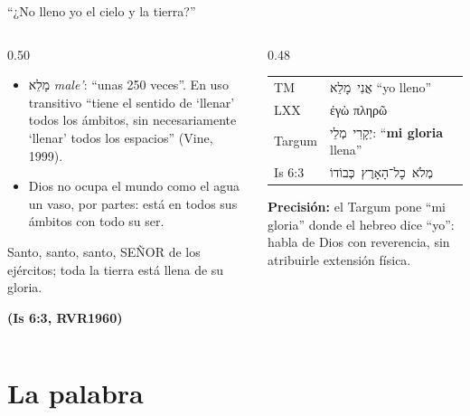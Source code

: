 \documentclass[hyperref={bookmarks=false},aspectratio=169]{beamer}
\newcommand{\heb}[1]{\mbox{\foreignlanguage{hebrew}{#1}}}
\newcommand{\grc}[1]{\foreignlanguage{ancientgreek}{#1}}
\newcommand{\SENOR}{S{\fontsize{0.78em}{1em}\selectfont EÑOR}}
\newcommand{\fuente}[1]{\par\hfill{\upshape\bfseries\footnotesize\textcolor{azul}{#1}}}
\newcommand{\destacar}[1]{\textbf{\textcolor{azul}{#1}}}
\newcommand{\precision}[1]{{\footnotesize\color{gris}\textbf{Precisión:} #1}}
\begin{document}
\begin{frame}{``¿No lleno yo el cielo y la tierra?''}
\begin{columns}[t,onlytextwidth]
\begin{column}{0.50\textwidth}\small
\begin{itemize}
\item \heb{מָלֵא} \emph{male'}: ``unas 250 veces''. En uso transitivo ``tiene el sentido de `llenar' todos los ámbitos, sin necesariamente `llenar' todos los espacios'' (Vine, 1999).
\item Dios no ocupa el mundo como el agua un vaso, por partes: está en todos sus ámbitos con todo su ser.
\end{itemize}
\begin{cita}[fontupper=\scriptsize\itshape]Santo, santo, santo, \SENOR{} de los ejércitos; toda la tierra está llena de su gloria.\fuente{(Is 6:3, RVR1960)}\end{cita}
\end{column}
\begin{column}{0.48\textwidth}\scriptsize\renewcommand{\arraystretch}{1.15}
\begin{tabular}{@{}>{\RaggedRight\arraybackslash}p{1.4cm}>{\RaggedRight\arraybackslash}p{4.3cm}@{}}
\toprule
TM & \heb{אֲנִי מָלֵא} ``yo lleno'' \\
LXX & \grc{ἐγὼ πληρῶ} \\
Targum & \heb{יְקָרִי מְלֵי}: ``\destacar{mi gloria} llena'' \\
Is 6:3 & \heb{מְלֹא כָל־הָאָרֶץ כְּבוֹדוֹ} \\
\bottomrule
\end{tabular}\par\smallskip
\precision{el Targum pone ``mi gloria'' donde el hebreo dice ``yo'': habla de Dios con reverencia, sin atribuirle extensión física.}
\end{column}
\end{columns}
\end{frame}

\section{La palabra}
\end{document}

